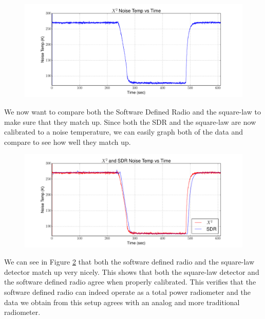 \begin{figure}[h!tb] \centering

\includegraphics[width=\textwidth]{Experiments/Exp1/x2_calibrated.pdf}

\label{X2_Calibrated}
\end{figure}

We now want to compare both the Software Defined Radio and the square-law to make sure that they match up.  Since both the SDR and the square-law are now calibrated to a noise temperature, we can easily graph both of the data and compare to see how well they match up.

\begin{figure}[h!tb] \centering

\includegraphics[width=\textwidth]{Experiments/Exp1/x2_SDR_Calibrated.pdf}

\label{X2_SDR_Both}
\end{figure}

We can see in Figure \ref{X2_SDR_Both} that both the software defined radio and the square-law detector match up very nicely.  This shows that both the square-law detector and the software defined radio agree when properly calibrated.  This verifies that the software defined radio can indeed operate as a total power radiometer and the data we obtain from this setup agrees with an analog and more traditional radiometer.
